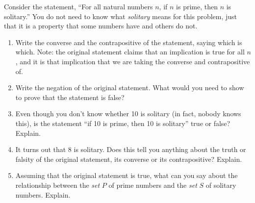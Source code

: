 \documentclass[11pt,]{book}
\theoremstyle{ptxplainnotitle}
\theoremstyle{ptxplaintitle}
\theoremstyle{ptxdefinitionnotitle}
\theoremstyle{ptxdefinitiontitle}
\theoremstyle{ptxdefinitionnotitle}
\theoremstyle{ptxdefinitiontitle}
\theoremstyle{ptxdefinitionnotitle}
\theoremstyle{ptxdefinitiontitle}
\theoremstyle{ptxdefinitiontitlenonumber}
\theoremstyle{ptxdefinitiontitlenonumber}
\numberwithin{equation}{chapter}
\begin{document}
\begin{divisionexercise}{21}\hypertarget{exercise-169}{}
\hypertarget{p-2224}{}%
Consider the statement, ``For all natural numbers \(n\), if \(n\) is prime, then \(n\) is solitary.''  You do not need to know what \emph{solitary} means for this problem, just that it is a property that some numbers have and others do not. \leavevmode%
\begin{enumerate}[label=(\alph*)]
\item\hypertarget{li-1170}{}\hypertarget{p-2225}{}%
Write the converse and the contrapositive of the statement, saying which is which.  Note: the original statement claims that an implication is true for all \(n\), and it is that implication that we are taking the converse and contrapositive of.%
\item\hypertarget{li-1171}{}\hypertarget{p-2226}{}%
Write the negation of the original statement.  What would you need to show to prove that the statement is false?%
\item\hypertarget{li-1172}{}\hypertarget{p-2227}{}%
Even though you don't know whether 10 is solitary (in fact, nobody knows this), is the statement ``if 10 is prime, then 10 is solitary'' true or false?  Explain.%
\item\hypertarget{li-1173}{}\hypertarget{p-2228}{}%
It turns out that 8 is solitary.  Does this tell you anything about the truth or falsity of the original statement, its converse or its contrapositive?  Explain.%
\item\hypertarget{li-1174}{}\hypertarget{p-2229}{}%
Assuming that the original statement is true, what can you say about the relationship between the \emph{set} \(P\) of prime numbers and the \emph{set} \(S\) of solitary numbers.  Explain.%
\end{enumerate}
%
\end{divisionexercise}%
\end{document}
